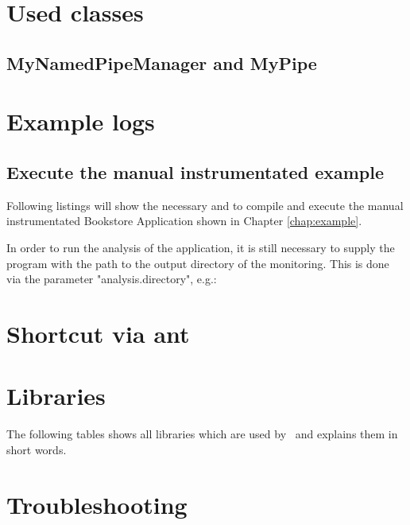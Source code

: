 \appendix
\chapter{Used classes}
      \section{MyNamedPipeManager and MyPipe}
	\setJavaCodeListing
	

	\setJavaCodeListing
	

\chapter{Example logs}
\section{Execute the manual instrumentated example}
Following listings will show the necessary  and  to compile and execute the manual instrumentated Bookstore Application shown in Chapter \ref{chap:example}.
\setXMLListing


In order to run the analysis of the application, it is still necessary to supply the program with the path to the output directory of the monitoring. This is done via the parameter "analysis.directory", e.g.:
\setBashListing


	
\chapter{Shortcut via ant}
\chapter{Libraries}
      The following tables shows all libraries which are used by \Kieker\ and explains them in short words.
      
\chapter{Troubleshooting}
